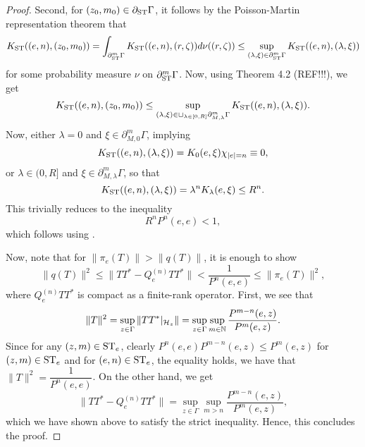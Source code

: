 \documentclass[12pt, class = article, crop = false, a4paper, twoside]{standalone}
\begin{document}
\begin{proof}
    Second, for $(z_{0}, m_{0})\in\partial_{\operatorname{ST}}\Gamma$, it follows by the Poisson-Martin representation theorem that
    \begin{equation*}
        K_{\operatorname{ST}}((e, n), (z_{0}, m_{0})) = \int_{\partial^{m}_{\operatorname{ST}}\Gamma}K_{\operatorname{ST}}((e, n), (r, \zeta))d\nu((r, \zeta))
        \leq \sup_{(\lambda, \xi)\in\partial^{m}_{\operatorname{ST}}\Gamma}K_{\operatorname{ST}}((e, n), (\lambda, \xi))
    \end{equation*}
    for some probability measure $\nu$ on $\partial^{m}_{\operatorname{ST}}\Gamma$. Now, using Theorem 4.2 (REF!!!), we get
    \begin{equation*}
        K_{\operatorname{ST}}((e, n), (z_{0}, m_{0})) \leq \sup_{(\lambda, \xi)\in\sqcup_{\lambda\in[0, R]}\partial^{m}_{M, \lambda}\Gamma}K_{\operatorname{ST}}((e, n), (\lambda, \xi)).
    \end{equation*}
    Now, either $\lambda = 0$ and $\xi\in\partial^{m}_{M, 0}\Gamma$, implying
    \begin{equation*}
        K_{\operatorname{ST}}((e, n), (\lambda, \xi)) =  K_{0}(e, \xi)\chi_{|e| = n} \equiv 0,
    \end{equation*}
    or $\lambda\in(0,R]$ and $\xi\in\partial^{m}_{M, \lambda}\Gamma$, so that
    \begin{equation*}
        K_{\operatorname{ST}}((e, n), (\lambda, \xi)) = \lambda^{n}K_{\lambda}(e, \xi) \leq R^{n}.
    \end{equation*}
    This trivially reduces to the inequality
    \begin{equation*}
        R^{n}P^{n}(e, e) < 1,
    \end{equation*}
    which follows using \cite[Theorem 7.8]{WOWO00}.

    Now, note that for $\|\pi_{e}(T)\| > \|q(T)\|$, it is enough to show
    \begin{equation*}
        \|q(T)\|^{2} \leq \|TT^{\ast}-Q^{(n)}_{e}TT^{\ast}\| < \dfrac{1}{P^{n}(e, e)} \leq \|\pi_{e}(T)\|^{2},
    \end{equation*}
    where $Q^{(n)}_{e}TT^{\ast}$ is compact as a finite-rank operator. First, we see that
    \begin{equation*}
        \|T\|^{2} = \sup_{z\in\Gamma}\|TT^{\ast}|_{\mathcal{H}_{z}}\| = \sup_{z\in\Gamma}\sup_{m\in\mathbb{N}}\dfrac{P^{m - n}(e, z)}{P^{m}(e, z)}.
    \end{equation*}
    Since for any $(z, m)\in\operatorname{ST}_{e}$, clearly $P^{n}(e, e)P^{m - n}(e, z) \leq P^{m}(e, z)$ for $(z, m)\in\operatorname{ST}_{e}$ and for $(e, n)\in\operatorname{ST}_{e}$, the equality holds, we have that $\|T\|^{2} = \dfrac{1}{P^{n}(e, e)}$. On the other hand, we get
    \begin{equation*}
        \|TT^{\ast}-Q^{(n)}_{e}TT^{\ast}\| = \sup_{z\in\Gamma}\sup_{m > n}\dfrac{P^{m - n}(e, z)}{P^{m}(e, z)},
    \end{equation*}
    which we have shown above to satisfy the strict inequality. Hence, this concludes the proof.
\end{proof}
\end{document}
